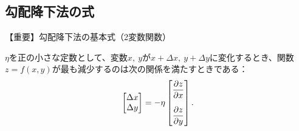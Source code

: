 \documentclass[dvipdfmx,aspectratio=169]{beamer}
\begin{document}
	\subsection{勾配降下法の式}
	\begin{frame}{【重要】勾配降下法の基本式（2変数関数）}
		\begin{screen}
			$ \eta $を正の小さな定数として、変数$ x,\ y $が$ x + \Delta x,\ y + \Delta y $に変化するとき、関数$ z = f(x, y) $が最も減少するのは次の関係を満たすときである：
			\begin{equation*}
				\begin{bmatrix}
					\Delta x\\ \Delta y
				\end{bmatrix} = -\eta \begin{bmatrix}
					\dfrac{\partial z}{\partial x}\vspace{1em}\\ \dfrac{\partial z}{\partial y}
				\end{bmatrix}.
			\end{equation*}
		\end{screen}
	\end{frame}
\end{document}
